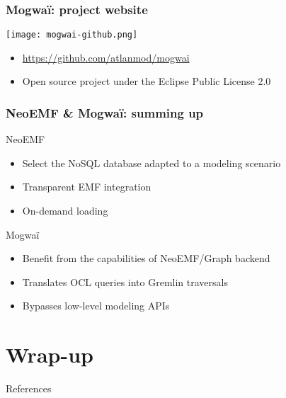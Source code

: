 \begin{frame}[c]\frametitle{Mogwa\"i: project website}
  \begin{center}
    \texttt{[image: mogwai-github.png]}
  \end{center}
	
  \begin{itemize}
  \item \url{https://github.com/atlanmod/mogwai}
  \item Open source project under the Eclipse Public License 2.0
  \end{itemize}
\end{frame}

\begin{frame}[c]\frametitle{NeoEMF \& Mogwa\"i: summing up}
	\begin{block}{NeoEMF}
	  \begin{itemize}
		\item Select the NoSQL database adapted to a modeling scenario
		\item Transparent EMF integration
		\item On-demand loading
	  \end{itemize}
	\end{block}

  \begin{block}{Mogwa\"i}
		\begin{itemize}
		\item Benefit from the capabilities of NeoEMF/Graph backend
		\item Translates OCL queries into Gremlin traversals
		\item Bypasses low-level modeling APIs
	  \end{itemize}
  \end{block}
\end{frame}

\section{Wrap-up}

\begin{frame}[allowframebreaks]{References}
  
  
\end{frame}


